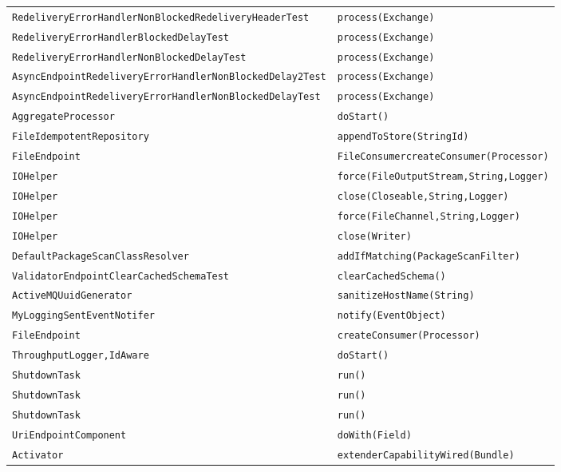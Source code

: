 \begin{center}
\begin{longtable}{ll}
\lstinline/RedeliveryErrorHandlerNonBlockedRedeliveryHeaderTest/&{\lstinline/process(Exchange)/}\\
\lstinline/RedeliveryErrorHandlerBlockedDelayTest/&{\lstinline/process(Exchange)/}\\
\lstinline/RedeliveryErrorHandlerNonBlockedDelayTest/&{\lstinline/process(Exchange)/}\\
\lstinline/AsyncEndpointRedeliveryErrorHandlerNonBlockedDelay2Test/&{\lstinline/process(Exchange)/}\\
\lstinline/AsyncEndpointRedeliveryErrorHandlerNonBlockedDelayTest/&{\lstinline/process(Exchange)/}\\
\lstinline/AggregateProcessor/&{\lstinline/doStart()/}\\
\lstinline/FileIdempotentRepository/&{\lstinline/appendToStore(StringId)/}\\
\lstinline/FileEndpoint/&{\lstinline/FileConsumercreateConsumer(Processor)/}\\
\lstinline/IOHelper/&{\lstinline/force(FileOutputStream,String,Logger)/}\\
\lstinline/IOHelper/&{\lstinline/close(Closeable,String,Logger)/}\\
\lstinline/IOHelper/&{\lstinline/force(FileChannel,String,Logger)/}\\
\lstinline/IOHelper/&{\lstinline/close(Writer)/}\\
\lstinline/DefaultPackageScanClassResolver/&{\lstinline/addIfMatching(PackageScanFilter)/}\\
\lstinline/ValidatorEndpointClearCachedSchemaTest/&{\lstinline/clearCachedSchema()/}\\
\lstinline/ActiveMQUuidGenerator/&{\lstinline/sanitizeHostName(String)/}\\
\lstinline/MyLoggingSentEventNotifer/&{\lstinline/notify(EventObject)/}\\
\lstinline/FileEndpoint/&{\lstinline/createConsumer(Processor)/}\\
\lstinline/ThroughputLogger,IdAware/&{\lstinline/doStart()/}\\
\lstinline/ShutdownTask/&{\lstinline/run()/}\\
\lstinline/ShutdownTask/&{\lstinline/run()/}\\
\lstinline/ShutdownTask/&{\lstinline/run()/}\\
\lstinline/UriEndpointComponent/&{\lstinline/doWith(Field)/}\\
\lstinline/Activator/&{\lstinline/extenderCapabilityWired(Bundle)/}\\

\end{longtable}
\end{center}
